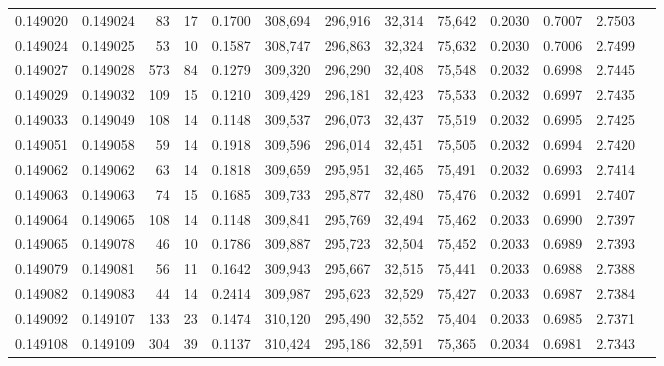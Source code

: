 \begin{tabular}{rrrrrrrrrrrrr}
0.149020 & 0.149024 &    83 &  17 &                                     0.1700 & 308,694 & 296,916 &  32,314 &  75,642 & 0.2030 & 0.7007 & 2.7503 \\
0.149024 & 0.149025 &    53 &  10 &                                     0.1587 & 308,747 & 296,863 &  32,324 &  75,632 & 0.2030 & 0.7006 & 2.7499 \\
0.149027 & 0.149028 &   573 &  84 &                                     0.1279 & 309,320 & 296,290 &  32,408 &  75,548 & 0.2032 & 0.6998 & 2.7445 \\
0.149029 & 0.149032 &   109 &  15 &                                     0.1210 & 309,429 & 296,181 &  32,423 &  75,533 & 0.2032 & 0.6997 & 2.7435 \\
0.149033 & 0.149049 &   108 &  14 &                                     0.1148 & 309,537 & 296,073 &  32,437 &  75,519 & 0.2032 & 0.6995 & 2.7425 \\
0.149051 & 0.149058 &    59 &  14 &                                     0.1918 & 309,596 & 296,014 &  32,451 &  75,505 & 0.2032 & 0.6994 & 2.7420 \\
0.149062 & 0.149062 &    63 &  14 &                                     0.1818 & 309,659 & 295,951 &  32,465 &  75,491 & 0.2032 & 0.6993 & 2.7414 \\
0.149063 & 0.149063 &    74 &  15 &                                     0.1685 & 309,733 & 295,877 &  32,480 &  75,476 & 0.2032 & 0.6991 & 2.7407 \\
0.149064 & 0.149065 &   108 &  14 &                                     0.1148 & 309,841 & 295,769 &  32,494 &  75,462 & 0.2033 & 0.6990 & 2.7397 \\
0.149065 & 0.149078 &    46 &  10 &                                     0.1786 & 309,887 & 295,723 &  32,504 &  75,452 & 0.2033 & 0.6989 & 2.7393 \\
0.149079 & 0.149081 &    56 &  11 &                                     0.1642 & 309,943 & 295,667 &  32,515 &  75,441 & 0.2033 & 0.6988 & 2.7388 \\
0.149082 & 0.149083 &    44 &  14 &                                     0.2414 & 309,987 & 295,623 &  32,529 &  75,427 & 0.2033 & 0.6987 & 2.7384 \\
0.149092 & 0.149107 &   133 &  23 &                                     0.1474 & 310,120 & 295,490 &  32,552 &  75,404 & 0.2033 & 0.6985 & 2.7371 \\
0.149108 & 0.149109 &   304 &  39 &                                     0.1137 & 310,424 & 295,186 &  32,591 &  75,365 & 0.2034 & 0.6981 & 2.7343 \\

\end{tabular}
